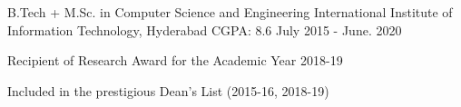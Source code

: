


\begin{cventries}

  \cventry
    {B.Tech + M.Sc. in Computer Science and Engineering} %
    {International Institute of Information Technology, Hyderabad} %
    {CGPA: 8.6} %
    {July 2015 - June. 2020} %
    {
      \begin{cvitems} %
        \item {Recipient of Research Award for the Academic Year 2018-19}
        \item {Included in the prestigious Dean's List (2015-16, 2018-19)}
      \end{cvitems}
    }

\end{cventries}
